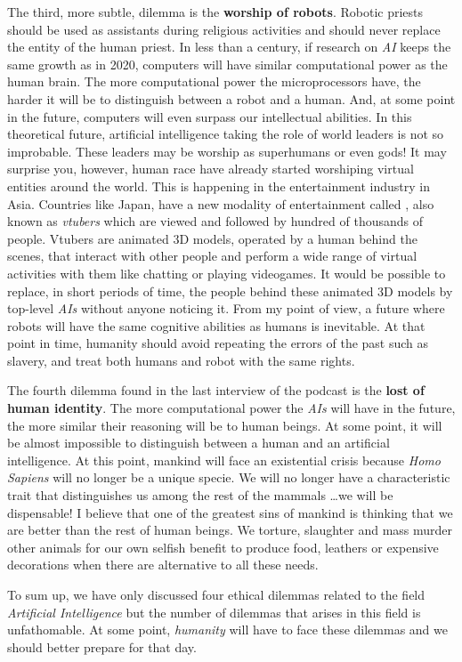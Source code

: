 \documentclass[12pt, a4paper]{article}
\begin{document}
The third, more subtle, dilemma is the \textbf{worship of robots}. Robotic priests should be used as assistants during religious activities and should never replace the entity of the human priest. In less than a century, if research on \textit{AI} keeps the same growth as in 2020, computers will have similar computational power as the human brain. The more computational power the microprocessors have, the harder it will be to distinguish between a robot and a human. And, at some point in the future, computers will even surpass our intellectual abilities. In this theoretical future, artificial intelligence taking the role of world leaders is not so improbable. These leaders may be worship as superhumans or even gods! It may surprise you, however, human race have already started worshiping virtual entities around the world. This is happening in the entertainment industry in Asia. Countries like Japan, have a new modality of entertainment called , also known as \textit{vtubers} which are viewed and followed by hundred of thousands of people. Vtubers are animated 3D models, operated by a human behind the scenes, that interact with other people and perform a wide range of virtual activities with them like chatting or playing videogames. It would be possible to replace, in short periods of time, the people behind these animated 3D models by top-level \textit{AIs} without anyone noticing it. From my point of view, a future where robots will have the same cognitive abilities as humans is inevitable. At that point in time, humanity should avoid repeating the errors of the past such as slavery, and treat both humans and robot with the same rights.

The fourth dilemma found in the last interview of the podcast is the \textbf{lost of human identity}. The more computational power the \textit{AIs} will have in the future, the more similar their reasoning will be to human beings. At some point, it will be almost impossible to distinguish between a human and an artificial intelligence. At this point, mankind will face an existential crisis because \textit{Homo Sapiens} will no longer be a unique specie. We will no longer have a characteristic trait that distinguishes us among the rest of the mammals \ldots we will be dispensable! I believe that one of the greatest sins of mankind is thinking that we are better than the rest of human beings. We torture, slaughter and mass murder other animals for our own selfish benefit to produce food, leathers or expensive decorations when there are alternative to all these needs.

To sum up, we have only discussed four ethical dilemmas related to the field \textit{Artificial Intelligence} but the number of dilemmas that arises in this field is unfathomable. At some point, \textit{humanity} will have to face these dilemmas and we should better prepare for that day.
\end{document}
